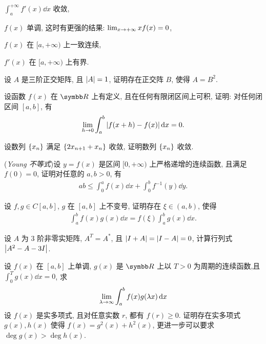 \documentclass{ctexart}
\begin{document}
\begin{exercise}[series=exer]
\begin{exercise}
        \item $ \int_{a}^{+\infty} f'(x) \dd{x} $ 收敛,
        \item $ f(x) $ 单调, 这时有更强的结果: $ \lim_{x \to +\infty} xf(x) = 0 $,
        \item $ f(x) $ 在 $ [a, +\infty) $ 上一致连续,
        \item $ f'(x) $ 在 $ [a, +\infty) $ 上有界. 
    \end{exercise}
    \item 设 $ A $ 是三阶正交矩阵, 且 $ \abs{A} = 1 $, 证明存在正交阵 $ B $, 使得 $ A = B^{2} $.  
    \item 设函数 $ f(x) $ 在 $ \R $ 上有定义, 且在任何有限闭区间上可积, 证明: 对任何闭区间 $ [a, b] $, 有
    \begin{align*}
        \lim_{h \to 0} \int_{a}^{b} \abs{f(x + h) - f(x)} \dd{x} = 0.
    \end{align*}
    \item 设数列 $ \qty{x_{n}} $ 满足 $ \qty{2x_{n+1} + x_{n}} $ 收敛, 证明数列 $ \qty{x_{n}} $ 收敛. 
    \item (\emph{Young 不等式})设 $ y=f(x) $ 是区间 $ [0, +\infty) $ 上严格递增的连续函数, 且满足 $ f(0) = 0 $, 证明对任意的 $ a, b > 0 $, 有
    \begin{align*}
        ab \le \int_{0}^{a}f(x) \dd{x} + \int_{0}^{b} f^{-1}(y) \dd{y}.
    \end{align*}
    \item 设 $ f, g \in C[a, b] $, $ g $ 在 $ [a, b] $ 上不变号, 证明存在 $ \xi\in (a, b) $, 使得
    \begin{align*}
        \int_{a}^{b} f(x)g(x) \dd{x} = f(\xi)\int_{a}^{b} g(x) \dd{x}.
    \end{align*}   
    \item 设 $ A $ 为 $ 3 $ 阶非零实矩阵, $ A^{T} = A^{*} $, 且 $ \abs{I + A} = \abs{I - A} = 0 $, 计算行列式 $ \abs{A^{2} - A - 3I} $.
    \item 设 $ f(x) $ 在 $ [a, b] $ 上单调, $ g(x) $ 是 $ \R $ 上以 $ T>0 $ 为周期的连续函数,且 $ \int_{0}^{T} g(x) \dd{x} = 0 $, 求
    \begin{align*}
        \lim_{\lambda \to \infty} \int_{a}^{b} f(x)g(\lambda x) \dd{x}
    \end{align*}
    \sitem 设 $ f(x) $ 是实多项式, 且对任意实数 $ r $, 都有 $ f(r) \ge 0 $. 证明存在实多项式 $ g(x), h(x) $ 使得 $ f(x) = g^{2}(x) + h^{2}(x) $, 更进一步可以要求 $ \deg g(x) > \deg h(x) $.   
    \begin{answer}
        \begin{answersheet}

\end{answersheet}
\end{answer}
\end{exercise}
\end{document}
